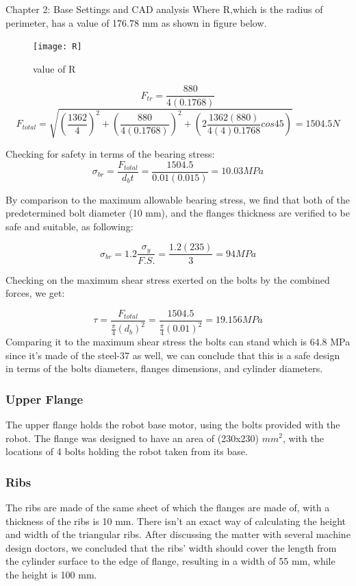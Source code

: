 \documentclass{book}
\begin{document}
\begin{chapter}{Chapter 2: Base Settings and CAD analysis}
Where R,which  is the radius of perimeter, has a value of 176.78 mm  as shown in figure below.

\begin{figure}[H]
	\begin{center}
		\texttt{[image: R]}
		\caption{value of R}
	\end{center}
\end{figure}

$$ F_{tr} = \frac{880}{4 (0.1768)} $$
$$ F_{total} = \sqrt{(\frac{1362}{4})^{2} + (\frac{880}{4 (0.1768)})^{2} + (2\frac{1362(880)}{4(4)0.1768} cos 45)} = 1504.5 N $$

Checking for safety in terms of the bearing stress:
\begin{equation}
\sigma_{br} = \frac{F_{total}}{d_{b} t} = \frac{1504.5}{0.01(0.015)} = 10.03MPa
\end{equation}

By comparison to the maximum allowable bearing stress, we find that both of the predetermined bolt diameter (10 mm), and the flanges thickness are verified to be safe and suitable, as following:

\begin{equation}
\sigma_{br} = 1.2 \frac{\sigma_{y}}{F.S.} = \frac{1.2(235)}{3} = 94 MPa
\end{equation}

Checking on the maximum shear stress exerted on the bolts by the combined forces, we get:

\begin{equation}
\tau = \frac{F_{total}}{\frac{\pi}{4} (d_{b})^{2}} = \frac{1504.5}{\frac{\pi}{4} (0.01)^{2}} = 19.156 MPa
\end{equation}
Comparing it to the maximum shear stress the bolts can stand which is 64.8 MPa since it's made of the steel-37 as well, we can conclude that this is a safe design in terms of the bolts diameters, flanges dimensions, and cylinder diameters.

\bigskip

\subsubsection{Upper Flange}
The upper flange holds the robot base motor, using the bolts provided with the robot. The flange was designed to have an area of (230x230) $mm^{2}$, with the locations of 4 bolts holding the robot taken from its base.

\bigskip

\subsubsection{Ribs}
The ribs are made of the same sheet of which the flanges are made of, with a thickness of the ribs is 10 mm. 
\newline There isn’t an exact way of calculating the height and width of the triangular ribs. After discussing the matter with several machine design doctors, we concluded that the ribs’ width should cover the length from the cylinder surface to the edge of flange, resulting in a width of 55 mm, while the height is 100 mm.



\end{chapter}
\end{document}
